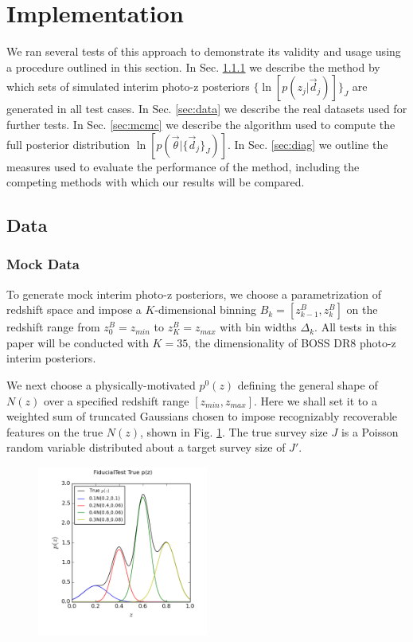 \documentclass[preprint]{aastex}
\begin{document}
\clearpage
\section{Implementation}
\label{sec:exp}

We ran several tests of this approach to demonstrate its validity and usage 
using a procedure outlined in this section.  In Sec. \ref{sec:mock} we describe 
the method by which sets of simulated interim photo-z posteriors 
$\{\ln[p(z_{j}|\vec{d}_{j})]\}_{J}$ are generated in all test cases.  In Sec. 
\ref{sec:data} we describe the real datasets used for further tests.  In Sec. 
\ref{sec:mcmc} we describe the algorithm used to compute the full posterior 
distribution $\ln[p(\vec{\theta}|\{\vec{d}_{j}\}_{J})]$.  In Sec. 
\ref{sec:diag} we outline the measures used to evaluate the performance of the 
method, including the competing methods with which our results will be compared.

\subsection{Data}
\label{sec:alldata}

\subsubsection{Mock Data}
\label{sec:mock}

To generate mock interim photo-z posteriors, we choose a parametrization of 
redshift space and impose a $K$-dimensional binning 
$B_{k}=[z^{B}_{k-1},z^{B}_{k}]$ on the redshift range from $z^{B}_{0}=z_{min}$ 
to $z^{B}_{K}=z_{max}$ with bin widths $\Delta_{k}$.  All tests in this paper 
will be conducted with $K=35$, the dimensionality of BOSS DR8 photo-z interim 
posteriors.  

We next choose a physically-motivated $p^{0}(z)$ defining the general shape of 
$N(z)$ over a specified redshift range $[z_{min},z_{max}]$.  Here we shall set 
it to a weighted sum of truncated Gaussians chosen to impose recognizably 
recoverable features on the true $N(z)$, shown in Fig. \ref{fig:physpz}.  The 
true survey size $J$ is a Poisson random variable distributed about a target 
survey size of $J'$.

\begin{figure}
\includegraphics[width=0.5\textwidth]{figs/null/physPz.png}
\caption{}
\label{fig:physpz}
\end{figure}
\end{document}
